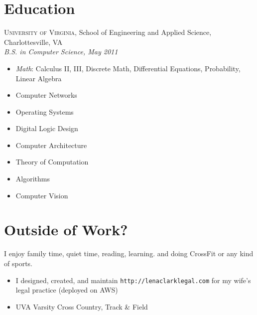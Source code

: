 \documentclass[12pt]{article}
\begin{document}

\section*{Education}

  \textsc{University of Virginia}, School of Engineering and Applied Science,
  Charlottesville, VA \\
  \textit{B.S. in Computer Science, May 2011}

  \begin{multicols}{3}
    \raggedright

    \begin{itemize}
    \item \textit{Math}: Calculus II, III, Discrete Math, Differential
      Equations, Probability, Linear Algebra
    \item Computer Networks
    \item Operating Systems
    \item Digital Logic Design
    \item Computer Architecture
    \item Theory of Computation
    \item Algorithms
    \item Computer Vision
    \end{itemize}
  \end{multicols}



\vskip 4pt
\section*{Outside of Work?}

I enjoy family time, quiet time, reading, learning. and doing CrossFit or any
kind of sports.

\begin{itemize}
\item I designed, created, and maintain \texttt{http://lenaclarklegal.com} for
  my wife's legal practice (deployed on AWS)
\item UVA Varsity Cross Country, Track \& Field
\end{itemize}
\end{document}
